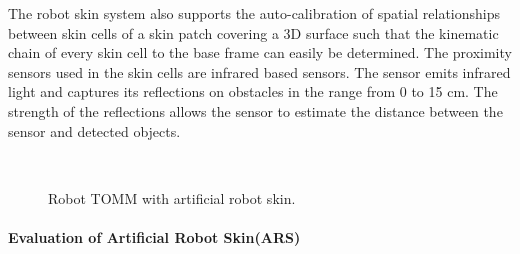 The robot skin system also supports the auto-calibration of spatial relationships between skin cells of a skin patch covering a 3D surface \cite{Mittendorfer-IROS12tendorfer} such that the kinematic chain of every skin cell to the base frame can easily be determined. The proximity sensors used in the skin cells are infrared based sensors. The sensor emits infrared light and captures its reflections on obstacles in the range from 0 to 15 cm. The strength of the reflections allows the sensor to estimate the distance between the sensor and detected objects.  


\begin{figure}[h]
\centering
{}\\[-10pt]
\caption[]{Robot TOMM with artificial robot skin.}
\label{fig:TommSorting}
\end{figure}

\paragraph{Evaluation of Artificial Robot Skin(ARS)}

